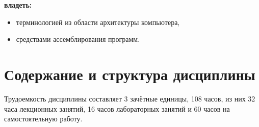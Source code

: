 \noindent\textbf{владеть:}
	\begin{itemize}[topsep=1mm]
		\item терминологией из области архитектуры компьютера,
		\item средствами ассемблирования программ.
	\end{itemize}

\section{Содержание и структура дисциплины}








Трудоемкость дисциплины составляет 3 зачётные единицы, 108 часов, из них 32 часа лекционных занятий, 16 часов лабораторных занятий и 60 часов на самостоятельную работу.

